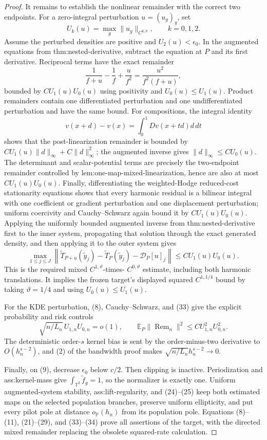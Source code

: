 \documentclass{article}
\begin{document}
\begin{proof}
It remains to establish the nonlinear remainder with the correct two endpoints.  For a zero-integral perturbation \(u=(u_g)_g\), set
\[
 U_k(u)=\max_g\|u_g\|_{C^{k,\vartheta}},\qquad k=0,1,2.
\tag{30}
\]
Assume the perturbed densities are positive and \(U_2(u)<\epsilon_0\).  In the augmented equations from thm:nested-derivative, subtract the equation at \(P\) and its first derivative.  Reciprocal terms have the exact remainder
\[
 \frac1{f+u}-\frac1f+\frac{u}{f^2}
 =\frac{u^2}{f^2(f+u)},
\tag{31}
\]
bounded by \(C U_1(u)U_0(u)\) using positivity and
\(U_0(u)\leq U_1(u)\).  Product remainders contain one differentiated perturbation and one undifferentiated perturbation and have the same bound.  For compositions, the integral identity
\[
 v(x+d)-v(x)=\int_0^1Dv(x+td)d\,dt
\tag{32}
\]
shows that the post-linearization remainder is bounded by
\(C U_1(u)\|d\|_\infty+C\|d\|_\infty^2\); the augmented inverse gives
\(\|d\|_\infty\leq C U_0(u)\).  The determinant and scalar-potential terms are precisely the two-endpoint remainder controlled by lem:one-map-mixed-linearization, hence are also at most \(C U_1(u)U_0(u)\).  Finally, differentiating the weighted-Hodge reduced-cost stationarity equations shows that every harmonic residual is a bilinear integral with one coefficient or gradient perturbation and one displacement perturbation; uniform coercivity and Cauchy--Schwarz again bound it by \(C U_1(u)U_0(u)\).  Applying the uniformly bounded augmented inverse from thm:nested-derivative first to the inner system, propagating that solution through the exact generated density, and then applying it to the outer system gives
\[
 \max_{1\leq j\leq J}
 \left\|
 \widetilde T_{P+u}(\widetilde y_j)-\widetilde T_P(\widetilde y_j)
 -\mathcal D_P[u]_j
 \right\|
 \leq C U_1(u)U_0(u).
\tag{33}
\]
This is the required mixed \(C^{1,\vartheta}\)-times-
\(C^{0,\vartheta}\) estimate, including both harmonic translations.  It implies the frozen target's displayed squared \(C^{1,1/4}\) bound by taking \(\vartheta=1/4\) and using
\(U_0(u)\leq U_1(u)\).

For the KDE perturbation, (8), Cauchy--Schwarz, and (33) give the explicit probability and risk controls
\[
 \sqrt{n/L_n}\,U_{1,n}U_{0,n}=o(1),
 \qquad
 \mathbb E_P\|\operatorname{Rem}_n\|^2
 \leq C U_{1,n}^2U_{0,n}^2.
\tag{34}
\]
The deterministic order-\(s\) kernel bias is sent by the order-minus-two derivative to
\(O(h_n^{s-2})\), and (2) of the bandwidth proof makes
\(\sqrt{n/L_n}h_n^{s-2}\to0\).

Finally, on (9), decrease \(\epsilon_0\) below \(c/2\).  Then clipping is inactive.  Periodization and ass:kernel-mass give
\(\int_{\mathbb T^2}\widetilde f_g=1\), so the normalizer is exactly one.  Uniform augmented-system stability, ass:lift-regularity, and (24)--(25) keep both estimated maps on the selected population branches, preserve uniform ellipticity, and put every pilot pole at distance
\(o_{\mathbb P}(h_n)\) from its population pole.  Equations (8)--(11), (21)--(29), and (33)--(34) prove all assertions of the target, with the directed mixed remainder replacing the obsolete squared-rate calculation.
\end{proof}
\end{document}
